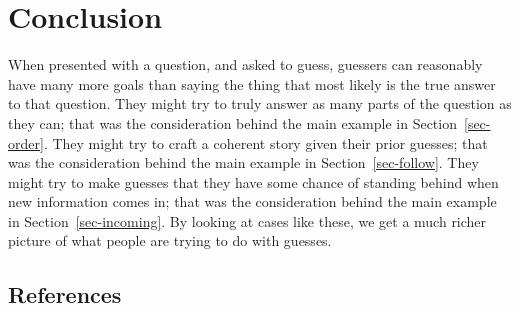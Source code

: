 \documentclass[
  11pt,
  letterpaper,
  DIV=11,
  numbers=noendperiod,
  twoside]{scrartcl}
\begin{document}
\section{Conclusion}\label{conclusion}

When presented with a question, and asked to guess, guessers can
reasonably have many more goals than saying the thing that most likely
is the true answer to that question. They might try to truly answer as
many parts of the question as they can; that was the consideration
behind the main example in Section~\ref{sec-order}. They might try to
craft a coherent story given their prior guesses; that was the
consideration behind the main example in Section~\ref{sec-follow}. They
might try to make guesses that they have some chance of standing behind
when new information comes in; that was the consideration behind the
main example in Section~\ref{sec-incoming}. By looking at cases like
these, we get a much richer picture of what people are trying to do with
guesses.

\subsection*{References}\label{references}
\end{document}
